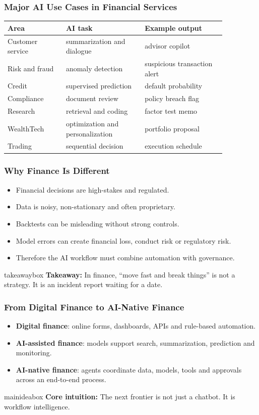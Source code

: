 \documentclass[aspectratio=169,12pt]{beamer}
\newcommand{\currentframetitle}{}
\newcommand{\slideTitle}[1]{\gdef\currentframetitle{#1}\frametitle{#1}}
\newcommand{\keyterm}[1]{\textbf{#1}}
\newcommand{\mainidea}[1]{%
  \vspace{0.08cm}
  \begin{beamercolorbox}[wd=\linewidth,rounded=true,sep=0.18cm]{mainideabox}
    \small\textbf{Core intuition:} #1
  \end{beamercolorbox}%
}
\newcommand{\takeaway}[1]{%
  \vspace{0.08cm}
  \begin{beamercolorbox}[wd=\linewidth,rounded=true,sep=0.18cm]{takeawaybox}
    \small\textbf{Takeaway:} #1
  \end{beamercolorbox}%
}
\begin{document}
\begin{frame}
\slideTitle{Major AI Use Cases in Financial Services}
\scriptsize
\begin{center}
\begin{tabular}{p{0.23\linewidth}p{0.31\linewidth}p{0.32\linewidth}}
\toprule
Area & AI task & Example output \\
\midrule
Customer service & summarization and dialogue & advisor copilot \\
Risk and fraud & anomaly detection & suspicious transaction alert \\
Credit & supervised prediction & default probability \\
Compliance & document review & policy breach flag \\
Research & retrieval and coding & factor test memo \\
WealthTech & optimization and personalization & portfolio proposal \\
Trading & sequential decision & execution schedule \\
\bottomrule
\end{tabular}
\end{center}
\end{frame}

\begin{frame}
\slideTitle{Why Finance Is Different}
\begin{itemize}
  \item Financial decisions are high-stakes and regulated.
  \item Data is noisy, non-stationary and often proprietary.
  \item Backtests can be misleading without strong controls.
  \item Model errors can create financial loss, conduct risk or regulatory risk.
  \item Therefore the AI workflow must combine automation with governance.
\end{itemize}
\takeaway{In finance, ``move fast and break things'' is not a strategy. It is an incident report waiting for a date.}
\end{frame}

\begin{frame}
\slideTitle{From Digital Finance to AI-Native Finance}
\begin{itemize}
  \item \keyterm{Digital finance}: online forms, dashboards, APIs and rule-based automation.
  \item \keyterm{AI-assisted finance}: models support search, summarization, prediction and monitoring.
  \item \keyterm{AI-native finance}: agents coordinate data, models, tools and approvals across an end-to-end process.
\end{itemize}
\mainidea{The next frontier is not just a chatbot. It is workflow intelligence.}
\end{frame}
\end{document}
